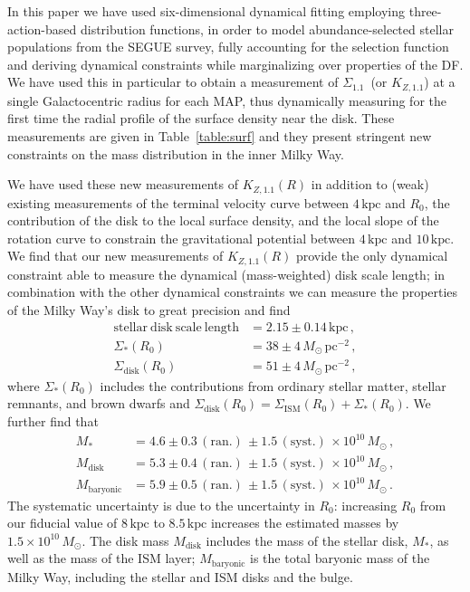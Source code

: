 \documentclass{emulateapj}
\renewcommand{\tablename}{Table}
\newcommand{\map}{MAP}
\newcommand{\kpc}{\ensuremath{\,\mathrm{kpc}}}
\newcommand{\pc}{\ensuremath{\,\mathrm{pc}}}
\newcommand{\sigoneone}{\ensuremath{\Sigma_{1.1}}}
\newcommand{\kzoneone}{\ensuremath{K_{Z,1.1}}}
\begin{document}
In this paper we have used six-dimensional dynamical fitting employing
three-action-based distribution functions, in order to model
abundance-selected stellar populations from the SEGUE survey, fully
accounting for the selection function and deriving dynamical
constraints while marginalizing over properties of the DF. We have
used this in particular to obtain a measurement of \sigoneone\ (or
\kzoneone) at a single Galactocentric radius for each \map, thus
dynamically measuring for the first time the radial profile of the
surface density near the disk. These measurements are given in
\tablename~\ref{table:surf} and they present stringent new constraints
on the mass distribution in the inner Milky Way.

We have used these new measurements of $\kzoneone(R)$ in addition to
(weak) existing measurements of the terminal velocity curve between
$4\kpc$ and $R_0$, the contribution of the disk to the local surface
density, and the local slope of the rotation curve to constrain the
gravitational potential between $4\kpc$ and $10\kpc$. We find that our
new measurements of $\kzoneone(R)$ provide the only dynamical
constraint able to measure the dynamical (mass-weighted) disk scale
length; in combination with the other dynamical constraints we can
measure the properties of the Milky Way's disk to great precision and
find
\begin{align*}
  \mathrm{stellar\ disk\ scale\ length} & = 2.15\pm0.14\kpc\,,\\
  \Sigma_{*}(R_0) & = 38\pm4\,M_\odot\pc^{-2}\,,\\
  \Sigma_{\mathrm{disk}}(R_0) & = 51\pm4\,M_\odot\pc^{-2}\,,
\end{align*}
where $\Sigma_{*}(R_0)$ includes the contributions from ordinary
stellar matter, stellar remnants, and brown dwarfs and
$\Sigma_{\mathrm{disk}}(R_0) =
\Sigma_{\mathrm{ISM}}(R_0)+\Sigma_{*}(R_0)$.  We further find that
\begin{align*}
  M_{*} & = 4.6\pm0.3\,(\mathrm{ran.})\,\pm1.5\,(\mathrm{syst.})\,\times10^{10}\,M_\odot\,,\\
  M_{\mathrm{disk}} & = 5.3\pm0.4\,(\mathrm{ran.})\,\pm1.5\,(\mathrm{syst.})\,\times10^{10}\,M_\odot\,,\\
  M_{\mathrm{baryonic}} & = 5.9\pm0.5\,(\mathrm{ran.})\,\pm1.5\,(\mathrm{syst.})\,\times10^{10}\,M_\odot\,.
\end{align*}
The systematic uncertainty is due to the uncertainty in $R_0$:
increasing $R_0$ from our fiducial value of $8\kpc$ to $8.5\kpc$
increases the estimated masses by $1.5\times10^{10}\,M_\odot$. The
disk mass $M_{\mathrm{disk}}$ includes the mass of the stellar disk,
$M_{*}$, as well as the mass of the ISM layer; $M_{\mathrm{baryonic}}$
is the total baryonic mass of the Milky Way, including the stellar and
ISM disks and the bulge.
\end{document}
